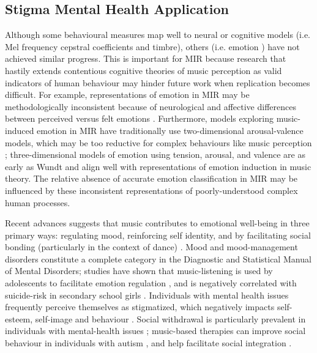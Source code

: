 \documentclass[a4paper]{article}
\begin{document}
\newpage
\subsection{Stigma Mental Health Application \label{sec:mental}}
Although some behavioural measures map well to neural or cognitive models (i.e. Mel frequency cepstral coefficients and timbre\cite{toiviainen1998timbre}), others (i.e. emotion \cite{kim2010music}) have not achieved similar progress. This is important for MIR because research that hastily extends contentious cognitive theories of music perception as valid indicators of human behaviour may hinder future work when replication becomes difficult. For example, representations of emotion in MIR may be methodologically inconsistent because of neurological and affective differences between perceived versus felt emotions \cite{krumhansl1997exploratory}. Furthermore, models exploring music-induced emotion in MIR have traditionally use two-dimensional arousal-valence models, which may be too reductive for complex behaviours like music perception \cite{eerola2010comparison}; three-dimensional models of emotion using tension, arousal, and valence are as early as Wundt \cite{wundt1897outlines} and align well with representations of emotion induction in music theory. The relative absence of accurate emotion classification in MIR may be influenced by these inconsistent representations of poorly-understood complex human processes. 

Recent advances suggests that music contributes to emotional well-being in three primary ways: regulating mood, reinforcing self identity, and by facilitating social bonding (particularly in the context of dance) \cite{hargreaves1999functions}. Mood and mood-management disorders constitute a complete category in the Diagnostic and Statistical Manual of Mental Disorders; studies have shown that music-listening is used by adolescents to facilitate emotion regulation \cite{Saari2013}, and is negatively correlated with suicide-risk in secondary school girls \cite{lacourse2001heavy}. Individuals with mental health issues frequently perceive themselves as stigmatized, which negatively impacts self-esteem, self-image and behaviour \cite{corrigan1999impact}. Social withdrawal is particularly prevalent in individuals with mental-health issues \cite{kawachi2001social}; music-based therapies can improve social behaviour in individuals with autism \cite{whipple2004music}, and help facilitate social integration \cite{clair2008therapeutic}. 
\end{document}
